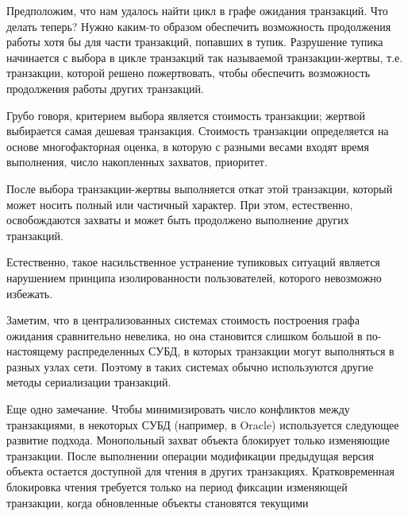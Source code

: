 Предположим, что нам удалось найти цикл в графе ожидания транзакций. Что делать теперь? Нужно каким-то образом обеспечить возможность продолжения работы хотя бы для части транзакций, попавших в тупик. Разрушение тупика начинается с выбора в цикле транзакций так называемой транзакции-жертвы, т.е. транзакции, которой решено пожертвовать, чтобы обеспечить возможность продолжения работы других транзакций.

Грубо говоря, критерием выбора является стоимость транзакции; жертвой выбирается самая дешевая транзакция. Стоимость транзакции определяется на основе многофакторная оценка, в которую с разными весами входят время выполнения, число накопленных захватов, приоритет.

После выбора транзакции-жертвы выполняется откат этой транзакции, который может носить полный или частичный характер. При этом, естественно, освобождаются захваты и может быть продолжено выполнение других транзакций.

Естественно, такое насильственное устранение тупиковых ситуаций является нарушением принципа изолированности пользователей, которого невозможно избежать.

Заметим, что в централизованных системах стоимость построения графа ожидания сравнительно невелика, но она становится слишком большой в по-настоящему распределенных СУБД, в которых транзакции могут выполняться в разных узлах сети. Поэтому в таких системах обычно используются другие методы сериализации транзакций.

Еще одно замечание. Чтобы минимизировать число конфликтов между транзакциями, в некоторых СУБД (например, в Oracle) используется следующее развитие подхода. Монопольный захват объекта блокирует только изменяющие транзакции. После выполнении операции модификации предыдущая версия объекта остается доступной для чтения в других транзакциях. Кратковременная блокировка чтения требуется только на период фиксации изменяющей транзакции, когда обновленные объекты становятся текущими \autocite{Serial}
